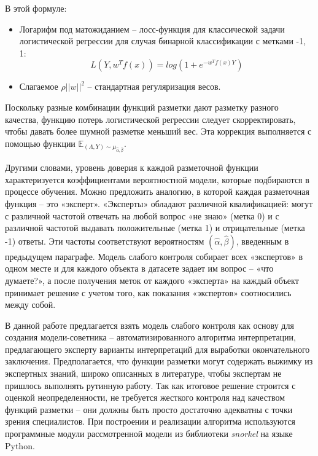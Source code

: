\par
В этой формуле:
\begin{itemize}
    \item Логарифм под матожиданием – лосс-функция для классической задачи логистической регрессии для случая бинарной классификации с метками {-1, 1}:
    \begin{equation}
    L(Y, w^Tf(x)) = log\left(1+e^{-w^Tf(x)Y}\right)
    \end{equation}
    \item Слагаемое $\rho||w||^2$ – стандартная регуляризация весов.
\end{itemize}
\par
Поскольку разные комбинации функций разметки дают разметку разного качества, функцию потерь логистической регрессии следует скорректировать, чтобы давать более шумной разметке меньший вес. Эта коррекция выполняется с помощью функции $\mathbb{E}_{(\Lambda, Y)\sim\mu_{\hat{\alpha}, \hat{\beta}}}$.
\par
Другими словами, уровень доверия к каждой разметочной функции характеризуется коэффициентами вероятностной модели, которые подбираются в процессе обучения. Можно предложить аналогию, в которой каждая разметочная функция – это «эксперт». «Эксперты» обладают различной квалификацией: могут с различной частотой отвечать на любой вопрос «не знаю» (метка 0) и с различной частотой выдавать положительные (метка 1) и отрицательные (метка -1) ответы. Эти частоты соответствуют вероятностям $(\hat{\alpha}, \hat{\beta})$, введенным в предыдущем параграфе. Модель слабого контроля собирает всех «экспертов» в одном месте и для каждого объекта в датасете задает им вопрос – «что думаете?», а после получения меток от каждого «эксперта» на каждый объект принимает решение с учетом того, как показания «экспертов» соотносились между собой.
\par
В данной работе предлагается взять модель слабого контроля как основу для создания модели-советника – автоматизированного алгоритма интерпретации, предлагающего эксперту варианты интерпретаций для выработки окончательного заключения. Предполагается, что функции разметки могут содержать выжимку из экспертных знаний, широко описанных в литературе, чтобы экспертам не пришлось выполнять рутинную работу. Так как итоговое решение строится с оценкой неопределенности, не требуется жесткого контроля над качеством функций разметки – они должны быть просто достаточно адекватны с точки зрения специалистов.
При построении и реализации алгоритма используются программные модули  рассмотренной модели из библиотеки \textit{snorkel} на языке Python.